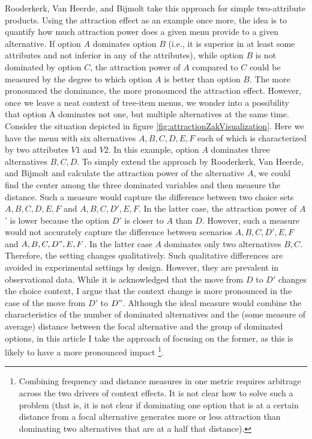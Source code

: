 \documentclass[a4paper,12pt]{article}
\newcommand{\citeyearonly}[1]{\citeyearpar{#1}}
\begin{document}
Rooderkerk, Van Heerde, and Bijmolt \citeyearonly{roodrkerkEtAl11} take this approach for simple two-attribute products. Using the attraction effect as an example once more, the idea is to quantify how much attraction power does a given menu provide to a given alternative. If option $A$ dominates option $B$ (i.e., it is superior in at least some attributes and not inferior in any of the attributes), while option $B$ is not dominated by option $C$, the attraction power of $A$ compared to $C$ could be measured by the degree to which option $A$ is better than option $B$. The more pronounced the dominance, the more pronounced the attraction effect. However, once we leave a neat context of tree-item menus, we wonder into a possibility that option A dominates not one, but multiple alternatives at the same time. Consider the situation depicted in figure \ref{fig:attractionZakVisualization}. Here we have the menu with six alternatives ${A, B, C, D, E, F}$ each of which is characterized by two attributes $V1$ and $V2$. In this example, option $A$ dominates three alternatives ${B, C, D}$. To simply extend the approach by Rooderkerk, Van Heerde, and Bijmolt \citeyearonly{roodrkerkEtAl11} and calculate the attraction power of the alternative $A$, we could find the center among the three dominated variables and then measure the distance. Such a measure would capture the difference between two choice sets ${A, B, C, D, E, F}$ and ${A, B, C, D', E, F}$. In the latter case, the attraction power of $A$' is lower because the option $D'$ is closer to $A$ than $D$. However, such a measure would not accurately capture the difference between scenarios ${A, B, C, D', E, F}$ and ${A, B, C, D", E, F}$. In the latter case $A$ dominates only two alternatives ${B, C}$. Therefore, the setting changes qualitatively. Such qualitative differences are avoided in experimental settings by design. However, they are prevalent in observational data. While it is acknowledged that the move from $D$ to $D'$ changes the choice context, I argue that the context change is more pronounced in the case of the move from $D'$ to $D"$. Although the ideal measure would combine the characteristics of the number of dominated alternatives and the (some measure of average) distance between the focal alternative and the group of dominated options, in this article I take the approach of focusing on the former, as this is likely to have a more pronounced impact \footnote{Combining frequency and distance measures in one metric requires arbitrage across the two drivers of context effects. It is not clear how to solve such a problem (that is, it is not clear if dominating one option that is at a certain distance from a focal alternative generates more or less attraction than dominating two alternatives that are at a half that distance).}. 
\end{document}
